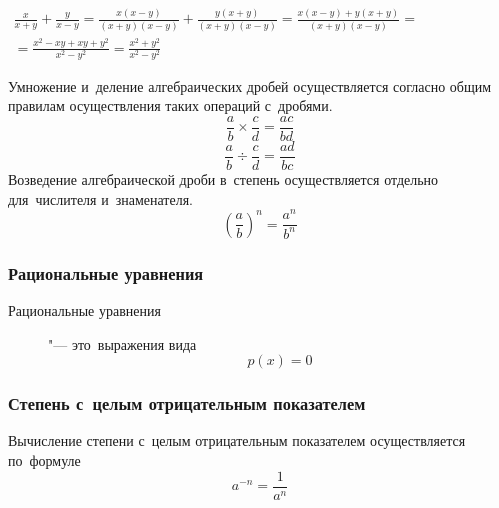 \documentclass[]{scrartcl}
\begin{document}
\begin{Thexmpl}\label{ex:alg-frac-1}
	
	$\begin{aligned}
		\frac{x}{x+y}+\frac{y}{x-y}=\frac{x(x-y)}{(x+y)(x-y)}+\frac{y(x+y)}{(x+y)(x-y)}=\frac{x(x-y)+y(x+y)}{(x+y)(x-y)}=\\
		=\frac{x^{2}-xy+xy+y^{2}}{x^{2}-y^{2}}=\frac{x^{2}+y^{2}}{x^{2}-y^{2}}
	\end{aligned}$
\end{Thexmpl}
Умножение и~деление алгебраических дробей осуществляется согласно общим правилам осуществления таких операций с~дробями.
\begin{equation}\label{eq:alg-frac-multiple}
\frac{a}{b}\times\frac{c}{d}=\frac{ac}{bd}
\end{equation}
\begin{equation}\label{eq:alg-frac-division}
\frac{a}{b}\div\frac{c}{d}=\frac{ad}{bc}
\end{equation}
Возведение алгебраической дроби в~степень осуществляется отдельно для~числителя и~знаменателя.
\begin{equation}\label{eq:alg-frac-power}
(\frac{a}{b})^n=\frac{a^n}{b^n}
\end{equation}

\subsubsection{Рациональные уравнения}
\begin{description}
	\item[Рациональные уравнения] "--- это~выражения вида
	\begin{equation}\label{eq:rational-equations}
	p(x)=0
	\end{equation}
\end{description}

\subsubsection{Степень с~целым отрицательным показателем}
Вычисление степени с~целым отрицательным показателем осуществляется по~формуле
\begin{equation}\label{eq:neg-power}
a^{-n}=\frac{1}{a^{n}}
\end{equation}
\end{document}
